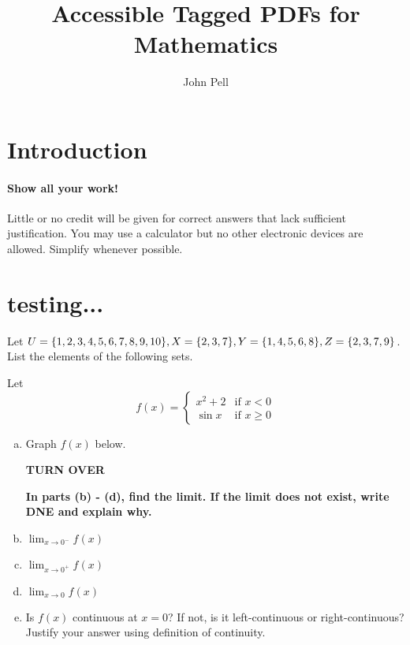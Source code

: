 \documentclass[english,lecture,12pt]{gWmaths}
\author{John Pell}
\title{Accessible Tagged PDFs for Mathematics}
\begin{document}
\maketitle

\section{Introduction}
\paragraph{Show all your work!} Little or no credit will be given for correct answers that lack sufficient justification. You may use a calculator but no other electronic devices are allowed. Simplify whenever possible.

\section{testing...}

\begin{theorem}[10 pts]
Let $U = \{1,2,3,4,5,6,7,8,9,10 \}, X = \{2,3,7 \},Y = \{1,4,5,6,8 \}, \\
Z = \{2,3,7,9 \}$. List the elements of the following sets. 
\end{theorem}

\Large


\begin{Exercise}
Let $$f(x) = \left\{
\begin{array}{ll} 
 x^2 + 2 & \text{if } x < 0 \\
\sin x & \text{if } x \geq 0
\end{array} \right. $$

\begin{enumerate}[a)]
\item Graph $f(x)$ below. \\


\centerline{\bf TURN OVER}
\vfill\eject

\noindent
\textbf{In parts (b) - (d), find the limit. If the limit does not exist, write DNE and explain why.} \\

\item  $\lim_{x \to 0^-} f(x)$
\vspace{0.3 in}
\item  $\lim_{x \to 0^+} f(x)$
\vspace{0.3 in}
\item  $\lim_{x \to 0} f(x)$
\vspace{0.5 in}
\item Is $f(x)$ continuous at $x = 0$? If not, is it left-continuous or right-continuous? Justify your answer using definition of continuity. 
\vspace{2 in}
\end{enumerate}
\end{Exercise}
\end{document}
